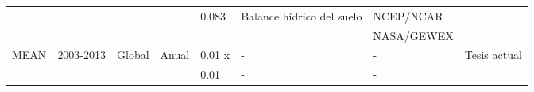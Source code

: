 \begin{sidewaystable}
\begin{tabular}{llllllll}
             &           &           &            & 0.083      & Balance hídrico del suelo & NCEP/NCAR  &                 \\
             &           &           &            &            &                           & NASA/GEWEX &                 \\
MEAN         & 2003-2013 & Global    & Anual      & 0.01 x     & -                         & -          & Tesis actual    \\
             &           &           &            & 0.01       & -                         & -          &                  \\ \hline 
\end{tabular}
\end{sidewaystable}